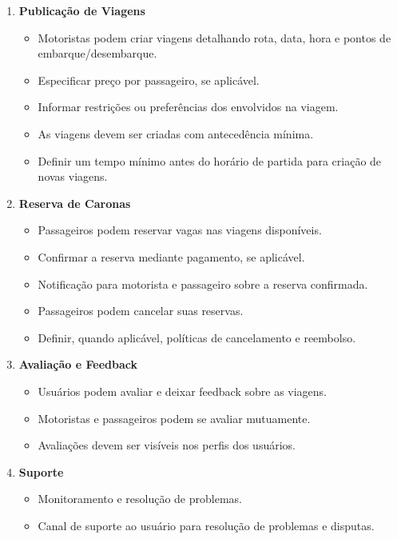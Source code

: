 \begin{enumerate}
	\item \textbf{Publicação de Viagens}
	
	\begin{itemize}
		\item Motoristas podem criar viagens detalhando rota, data, hora e pontos de embarque/desembarque.
		\item Especificar preço por passageiro, se aplicável.
		\item Informar restrições ou preferências dos envolvidos na viagem.
		\item As viagens devem ser criadas com antecedência mínima.
		\item Definir um tempo mínimo antes do horário de partida para criação de novas viagens.
	\end{itemize}
	
	\item \textbf{Reserva de Caronas}
	
	\begin{itemize}
		\item Passageiros podem reservar vagas nas viagens disponíveis.
		\item Confirmar a reserva mediante pagamento, se aplicável.
		\item Notificação para motorista e passageiro sobre a reserva confirmada.
		\item Passageiros podem cancelar suas reservas.
		\item Definir, quando aplicável, políticas de cancelamento e reembolso.
	\end{itemize}
	
	\item \textbf{Avaliação e Feedback}
	
	\begin{itemize}
		\item Usuários podem avaliar e deixar feedback sobre as viagens.
		\item Motoristas e passageiros podem se avaliar mutuamente.
		\item Avaliações devem ser visíveis nos perfis dos usuários.
	\end{itemize}
	
	\item \textbf{Suporte}
	
	\begin{itemize}
		\item Monitoramento e resolução de problemas.
		\item Canal de suporte ao usuário para resolução de problemas e disputas.
	\end{itemize}

\end{enumerate}

